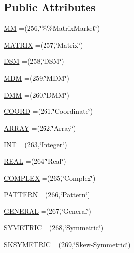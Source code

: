 \subsection*{Public Attributes}
\begin{DoxyCompactItemize}
\item 
\hyperlink{enumscanner_1_1Symbol_af4fb1e091459c3690d75e935cedf9a0c}{MM} =(256,\char`\"{}\%\%Matrix\+Market\char`\"{})
\item 
\hyperlink{enumscanner_1_1Symbol_ad4e8096b9d2c15f7a60ab047f4775587}{M\+A\+T\+R\+IX} =(257,\char`\"{}Matrix\char`\"{})
\item 
\hyperlink{enumscanner_1_1Symbol_ab0feed5b9424b0e1b51e308b308ad5a4}{D\+SM} =(258,\char`\"{}D\+SM\char`\"{})
\item 
\hyperlink{enumscanner_1_1Symbol_a81c78a2d8a9cc8251b277daba3086f37}{M\+DM} =(259,\char`\"{}M\+DM\char`\"{})
\item 
\hyperlink{enumscanner_1_1Symbol_ab0d045eb60ad3ff556028fb77fafe808}{D\+MM} =(260,\char`\"{}D\+MM\char`\"{})
\item 
\hyperlink{enumscanner_1_1Symbol_a4b0a4728ba24bbaa59681fc3846f4ccb}{C\+O\+O\+RD} =(261,\char`\"{}Coordinate\char`\"{})
\item 
\hyperlink{enumscanner_1_1Symbol_ab1c516201ec260d71a5127db4bd31ba1}{A\+R\+R\+AY} =(262,\char`\"{}Array\char`\"{})
\item 
\hyperlink{enumscanner_1_1Symbol_a834e51bc001411d99f5c903941982b10}{I\+NT} =(263,\char`\"{}Integer\char`\"{})
\item 
\hyperlink{enumscanner_1_1Symbol_add6a5347584a401c1af01fce41f59a4d}{R\+E\+AL} =(264,\char`\"{}Real\char`\"{})
\item 
\hyperlink{enumscanner_1_1Symbol_a3a17094f3037fbbbbeb7167b341f93d0}{C\+O\+M\+P\+L\+EX} =(265,\char`\"{}Complex\char`\"{})
\item 
\hyperlink{enumscanner_1_1Symbol_a30afa7ce84ee23d7012d3bbbc19c2134}{P\+A\+T\+T\+E\+RN} =(266,\char`\"{}Pattern\char`\"{})
\item 
\hyperlink{enumscanner_1_1Symbol_a655847fe3017a32515ceba8421e1e299}{G\+E\+N\+E\+R\+AL} =(267,\char`\"{}General\char`\"{})
\item 
\hyperlink{enumscanner_1_1Symbol_addfd36caed0aa6a5671258b44f1343f3}{S\+Y\+M\+E\+T\+R\+IC} =(268,\char`\"{}Symmetric\char`\"{})
\item 
\hyperlink{enumscanner_1_1Symbol_ac3fb066b62b3749077e8928786cd787a}{S\+K\+S\+Y\+M\+E\+T\+R\+IC} =(269,\char`\"{}Skew-\/Symmetric\textquotesingle{}\char`\"{})
\item 

\end{DoxyCompactItemize}
